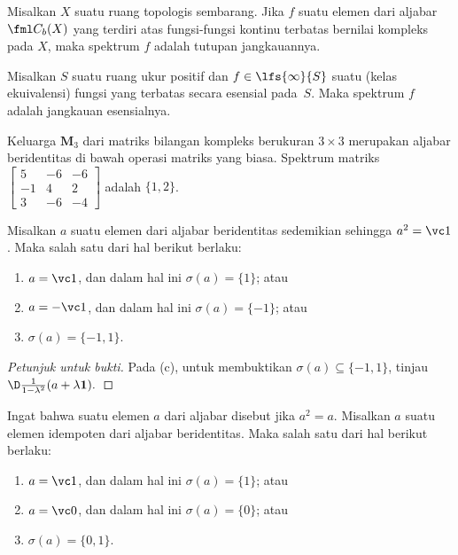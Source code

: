 
\begin{exam} Misalkan $X$ suatu ruang topologis sembarang. Jika $f$ suatu elemen dari
aljabar $\fml C_b(X)$ yang terdiri atas fungsi-fungsi kontinu terbatas bernilai kompleks pada $X$, maka
spektrum $f$ adalah tutupan jangkauannya.
\end{exam}

\begin{exam} Misalkan $S$ suatu ruang ukur positif dan $f \in \lfs{\infty}{S}$ suatu
(kelas ekuivalensi) fungsi yang terbatas secara esensial pada~$S$. Maka
spektrum $f$ adalah jangkauan esensialnya.
\end{exam}

\begin{exam} Keluarga $\mathbf M_3$ dari matriks bilangan kompleks berukuran $3 \times 3$ merupakan aljabar
beridentitas di bawah operasi matriks yang biasa. Spektrum matriks $\begin{bmatrix} 5
& -6 & -6 \\ -1 & 4 & 2 \\ 3 & -6 & -4 \end{bmatrix}$ adalah $\{1,2\}$.
\end{exam}

\begin{prop} Misalkan $a$ suatu elemen dari aljabar beridentitas sedemikian sehingga $a^2 = \vc 1$.
Maka salah satu dari hal berikut berlaku:
 \begin{enumerate}[label=\rm{(\alph*)}]
  \item $a = \vc 1$, dan dalam hal ini $\sigma(a) = \{1\}$; atau
  \item $a = -\vc 1$, dan dalam hal ini $\sigma(a) = \{-1\}$; atau
  \item $\sigma(a) = \{-1,1\}$.
 \end{enumerate}
\end{prop}

\begin{proof}[\emph{Petunjuk untuk bukti}] Pada (c), untuk membuktikan $\sigma(a) \subseteq \{-1,1\}$,
tinjau $\D\frac1{1 - \lambda^2}(a + \lambda \mathbf 1).$  \ns
\end{proof}

\begin{prop} Ingat bahwa suatu elemen $a$ dari aljabar disebut
 jika $a^2 = a$. Misalkan $a$ suatu elemen idempoten dari aljabar beridentitas. Maka
salah satu dari hal berikut berlaku:
 \begin{enumerate}[label=\rm{(\alph*)}]
  \item $a = \vc 1$, dan dalam hal ini $\sigma(a) = \{1\}$; atau
  \item $a = \vc 0$, dan dalam hal ini $\sigma(a) = \{0\}$; atau
  \item $\sigma(a) = \{0,1\}$.
 \end{enumerate}
\end{prop}

